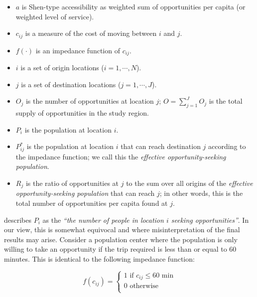\documentclass[]{elsarticle} %
\providecommand{\tightlist}{%
  \setlength{\itemsep}{0pt}\setlength{\parskip}{0pt}}
\begin{document}
\begin{itemize}
\tightlist
\item
  \(a\) is Shen-type accessibility as weighted sum of opportunities per
  capita (or weighted level of service).
\item
  \(c_{ij}\) is a measure of the cost of moving between \(i\) and \(j\).
\item
  \(f(\cdot)\) is an impedance function of \(c_{ij}\).
\item
  \(i\) is a set of origin locations (\(i = 1,\cdots,N\)).
\item
  \(j\) is a set of destination locations (\(j = 1,\cdots,J\)).
\item
  \(O_j\) is the number of opportunities at location \(j\);
  \(O = \sum_{j=1}^J O_j\) is the total supply of opportunities in the
  study region.
\item
  \(P_i\) is the population at location \(i\).
\item
  \(P_{ij}^*\) is the population at location \(i\) that can reach
  destination \(j\) according to the impedance function; we call this
  the \emph{effective opportunity-seeking population}.
\item
  \(R_j\) is the ratio of opportunities at \(j\) to the sum over all
  origins of the \emph{effective opportunity-seeking population} that
  can reach \(j\); in other words, this is the total number of
  opportunities per capita found at \(j\).
\end{itemize}

\citet{shen1998} describes \(P_i\) as the \emph{``the number of people
in location \(i\) seeking opportunities''}. In our view, this is
somewhat equivocal and where misinterpretation of the final results may
arise. Consider a population center where the population is only willing
to take an opportunity if the trip required is less than or equal to 60
minutes. This is identical to the following impedance function:

\begin{equation}
\label{eq:binary-impedance}
f(c_{ij}) =
\begin{cases}
1\text{ if }c_{ij}\leq60\text{ min}\\
0\text{ otherwise}\\
\end{cases}
\end{equation}
\end{document}
